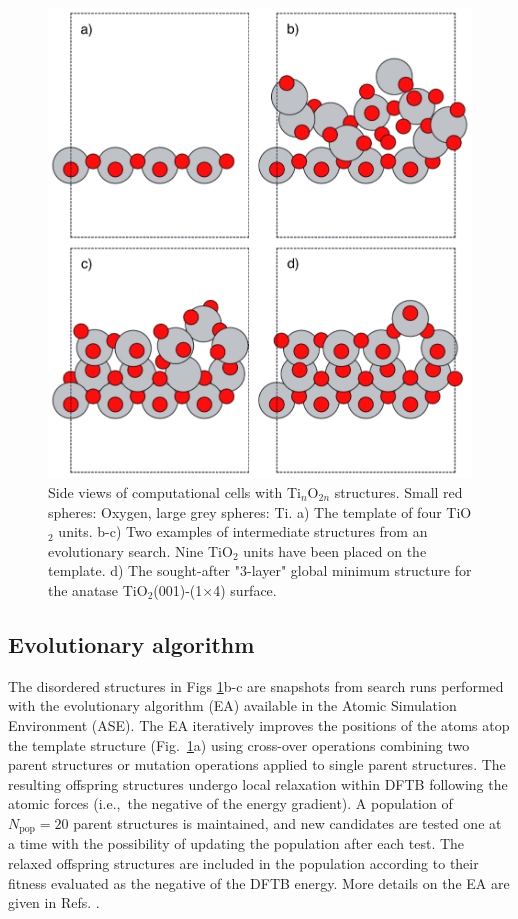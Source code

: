 \documentclass[aip,amsmath,amssymb,reprint]{revtex4-1}
\begin{document}
\begin{figure}[tb]
    \centering
    \includegraphics[width=1.0\columnwidth]{fig1-intro.pdf}
    \caption{Side views of computational cells with Ti$_{n}$O$_{2n}$ structures.
      Small red spheres: Oxygen, large grey spheres: Ti.
      a) The template of four TiO$_2$ units.
      b-c) Two examples of intermediate structures from an evolutionary search. Nine TiO$_2$ units
      have been placed on the template.
      d) The sought-after "3-layer" global minimum structure for the anatase TiO$_2$(001)-(1$\times$4) surface.
    }
    \label{figintro}
\end{figure}

\subsection{Evolutionary algorithm}
The disordered structures in Figs \ref{figintro}b-c are snapshots from
search runs performed with the evolutionary algorithm (EA) available
in the Atomic Simulation Environment (ASE)\cite{ase2}.  The EA
iteratively improves the positions of the atoms atop the template
structure (Fig.\ \ref{figintro}a) using cross-over operations
combining two parent structures or mutation operations applied to
single parent structures. The resulting offspring structures undergo
local relaxation within DFTB following the atomic forces (i.e.,\ the negative of
the energy gradient). A population of $N_\mathrm{pop}=20$ parent structures
is maintained, and new candidates are tested one at a time with the possibility
of updating the population after each test.
The relaxed offspring structures are included in the population
according to their fitness evaluated as the negative of the DFTB energy.
More details on the EA are given in Refs. \cite{Vilhelmsen2012, Vilhelmsen2014}.
\end{document}
